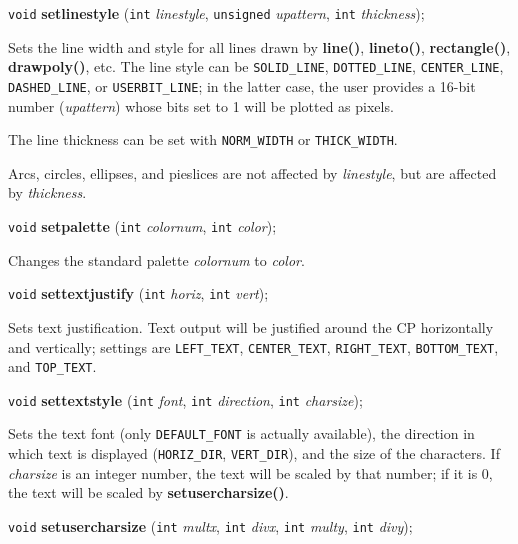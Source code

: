 \documentclass[a4paper,11pt]{article}
\newcommand{\V}{\texttt{void}}      %
\newcommand{\I}{\texttt{int}}       %
\newcommand{\func}[1]{\textbf{#1}}  %
\newcommand{\A}[1]{\emph{#1}}       %
\newcommand{\T}[1]{\texttt{#1}}     %
\newenvironment{bgi}
{ %
  \begin{snugshade}
}
{ %
  \end{snugshade}
}
\begin{document}
\begin{bgi}
\V{} \func{setlinestyle} (\I{} \A{linestyle}, \texttt{unsigned}
\A{upattern}, \I{} \A{thickness});
\end{bgi}

Sets the line width and style for all lines drawn by \func{line()},
\func{lineto()}, \func{rectangle()}, \func{drawpoly()}, etc. The line
style can be \T{SOLID\_LINE}, \T{DOTTED\_LINE}, \T{CENTER\_LINE},
\T{DASHED\_LINE}, or \T{USERBIT\_LINE}; in the latter case, the user
provides a 16-bit number (\A{upattern}) whose bits set to 1 will be
plotted as pixels.

The line thickness can be set with \T{NORM\_WIDTH} or
\T{THICK\-\_WIDTH}.

Arcs, circles, ellipses, and pieslices are not affected by
\A{linestyle}, but are affected by \A{thickness}.


\begin{bgi}
\V{} \func{setpalette} (\I{} \A{colornum}, \I{} \A{color}); 
\end{bgi}

Changes the standard palette \A{colornum} to \A{color}.


\begin{bgi}
\V{} \func{settextjustify} (\I{} \A{horiz}, \I{} \A{vert});
\end{bgi}

Sets text justification. Text output will be justified around the CP
horizontally and vertically; settings are \T{LEFT\_TEXT},
\T{CENTER\_TEXT}, \T{RIGHT\-\_TEXT}, \T{BOTTOM\_TEXT}, and
\T{TOP\_TEXT}.


\begin{bgi}
\V{} \func{settextstyle} (\I{} \A{font}, \I{} \A{direction}, \I{}
\A{charsize});
\end{bgi}

Sets the text font (only \T{DEFAULT\_FONT} is actually available), the
direction in which text is displayed (\T{HORIZ\_DIR}, \T{VERT\_DIR}),
and the size of the characters. If \A{charsize} is an integer number,
the text will be scaled by that number; if it is 0, the text will be
scaled by \func{setusercharsize()}.



\begin{bgi}
\V{} \func{setusercharsize} (\I{} \A{multx}, \I{} \A{divx}, \I{}
\A{multy}, \I{} \A{divy});
\end{bgi}
\end{document}
